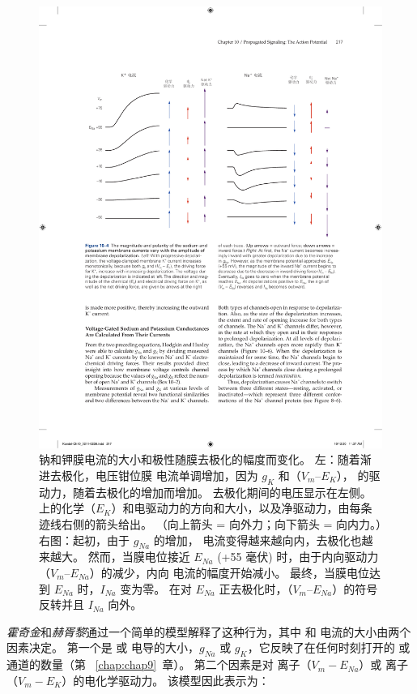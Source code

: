 \begin{figure}[htbp]
	\centering
	\includegraphics[width=1.0\linewidth]{chap10/fig_10_4}
	\caption{钠和钾膜电流的大小和极性随膜去极化的幅度而变化。
		左：随着渐进去极化，电压钳位膜  电流单调增加，因为 $g_K$ 和（$V_m – E_K$）， 的驱动力，随着去极化的增加而增加。
		去极化期间的电压显示在左侧。
		 上的化学（$E_K$）和电驱动力的方向和大小，以及净驱动力，由每条迹线右侧的箭头给出。
		（向上箭头 = 向外力；向下箭头 = 向内力。）右图：起初，由于 $g_{Na}$ 的增加， 电流变得越来越向内，去极化也越来越大。
		然而，当膜电位接近 $E_{Na}$ (+55 毫伏) 时，由于内向驱动力（$V_m – E_{Na}$）的减少，内向  电流的幅度开始减小。
		最终，当膜电位达到 $E_{Na}$ 时，$I_{Na}$ 变为零。
		在对 $E_{Na}$ 正去极化时，（$V_m – E_{Na}$）的符号反转并且 $I_{Na}$ 向外。}
	\label{fig:10_4}
\end{figure}


\textit{霍奇金}和\textit{赫胥黎}通过一个简单的模型解释了这种行为，其中  和  电流的大小由两个因素决定。
第一个是  或  电导的大小，$g_{Na}$ 或 $g_K$，它反映了在任何时刻打开的  或  通道的数量（第 ~\ref{chap:chap9}~章）。
第二个因素是对  离子（$V_m − E_{Na}$）或  离子（$V_m − E_K$）的电化学驱动力。
该模型因此表示为：

